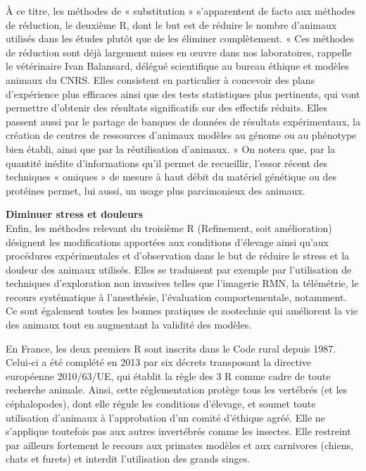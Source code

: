 \documentclass[10pt]{article}
\begin{document}
 À ce titre, les méthodes de « substitution » s’apparentent de facto aux méthodes de réduction, le deuxième R, dont le but est de réduire le nombre d’animaux utilisés dans les études plutôt que de les éliminer complètement. « Ces méthodes de réduction sont déjà largement mises en œuvre dans nos laboratoires, rappelle le vétérinaire Ivan Balansard, délégué scientifique au bureau éthique et modèles animaux du CNRS. Elles consistent en particulier à concevoir des plans d’expérience plus efficaces ainsi que des tests statistiques plus pertinents, qui vont permettre d’obtenir des résultats significatifs sur des effectifs réduits. Elles passent aussi par le partage de banques de données de résultats expérimentaux, la création de centres de ressources d’animaux modèles au génome ou au phénotype bien établi, ainsi que par la réutilisation d’animaux. » On notera que, par la quantité inédite d’informations qu’il permet de recueillir, l’essor récent des techniques « omiques » de mesure à haut débit du matériel génétique ou des protéines permet, lui aussi, un usage plus parcimonieux des animaux.\\
 
 \newpage
 
\textbf{ Diminuer stress et douleurs}\\
 
 Enfin, les méthodes relevant du troisième R (Refinement, soit amélioration) désignent les modifications apportées aux conditions d’élevage ainsi qu’aux procédures expérimentales et d’observation dans le but de réduire le stress et la douleur des animaux utilisés. Elles se traduisent par exemple par l’utilisation de techniques d’exploration non invasives telles que l’imagerie RMN, la télémétrie, le recours systématique à l’anesthésie, l’évaluation comportementale, notamment. Ce sont également toutes les bonnes pratiques de zootechnie qui améliorent la vie des animaux tout en augmentant la validité des modèles.
 
  En France, les deux premiers R sont inscrits dans le Code rural depuis 1987. Celui-ci a été complété en 2013 par six décrets transposant la directive européenne 2010/63/UE, qui établit la règle des 3 R comme cadre de toute recherche animale. Ainsi, cette réglementation protège tous les vertébrés (et les céphalopodes), dont elle régule les conditions d’élevage, et soumet toute utilisation d’animaux à l’approbation d’un comité d’éthique agréé. Elle ne s’applique toutefois pas aux autres invertébrés comme les insectes. Elle restreint par ailleurs fortement le recours aux primates modèles et aux carnivores (chiens, chats et furets) et interdit l’utilisation des grands singes.\\
  
\end{document}
